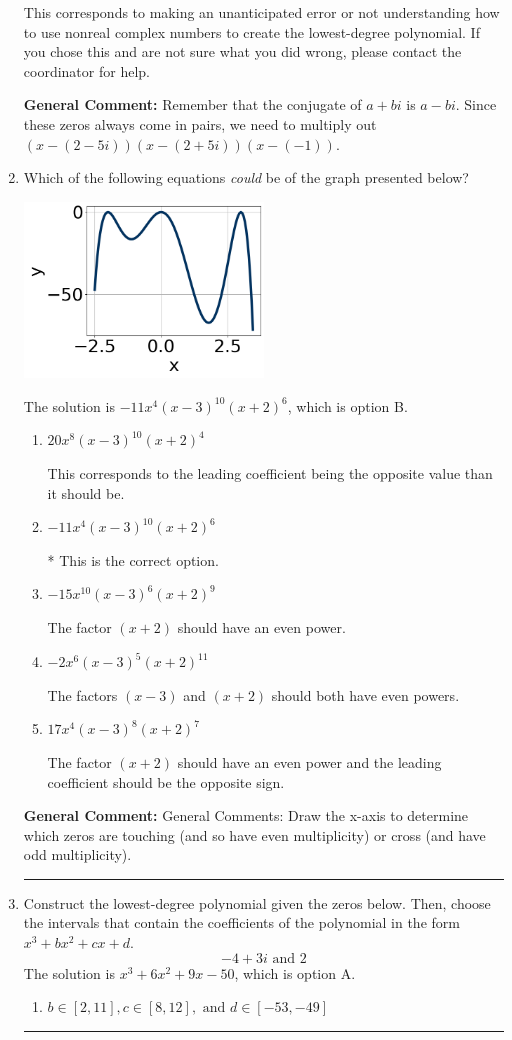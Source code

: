 \documentclass{extbook}[14pt]
\newcommand{\litem}[1]{\item #1

\rule{\textwidth}{0.4pt}}
\begin{document}
\begin{enumerate}
{\begin{enumerate}[label=\Alph*.]
This corresponds to making an unanticipated error or not understanding how to use nonreal complex numbers to create the lowest-degree polynomial. If you chose this and are not sure what you did wrong, please contact the coordinator for help.
\end{enumerate}

\textbf{General Comment:} Remember that the conjugate of $a+bi$ is $a-bi$. Since these zeros always come in pairs, we need to multiply out $(x-(2 - 5 i))(x-(2 + 5 i))(x-(-1))$.
}
\litem{
Which of the following equations \textit{could} be of the graph presented below?

\begin{center}
    \includegraphics[width=0.5\textwidth]{../Figures/polyGraphToFunctionC.png}
\end{center}


The solution is \( -11x^{4} (x - 3)^{10} (x + 2)^{6} \), which is option B.\begin{enumerate}[label=\Alph*.]
\item \( 20x^{8} (x - 3)^{10} (x + 2)^{4} \)

This corresponds to the leading coefficient being the opposite value than it should be.
\item \( -11x^{4} (x - 3)^{10} (x + 2)^{6} \)

* This is the correct option.
\item \( -15x^{10} (x - 3)^{6} (x + 2)^{9} \)

The factor $(x + 2)$ should have an even power.
\item \( -2x^{6} (x - 3)^{5} (x + 2)^{11} \)

The factors $(x - 3)$ and $(x + 2)$ should both have even powers.
\item \( 17x^{4} (x - 3)^{8} (x + 2)^{7} \)

The factor $(x + 2)$ should have an even power and the leading coefficient should be the opposite sign.
\end{enumerate}

\textbf{General Comment:} General Comments: Draw the x-axis to determine which zeros are touching (and so have even multiplicity) or cross (and have odd multiplicity).
}
\litem{
Construct the lowest-degree polynomial given the zeros below. Then, choose the intervals that contain the coefficients of the polynomial in the form $x^3+bx^2+cx+d$.
\[ -4 + 3 i \text{ and } 2 \]The solution is \( x^{3} +6 x^{2} +9 x -50 \), which is option A.\begin{enumerate}[label=\Alph*.]
\item \( b \in [2, 11], c \in [8, 12], \text{ and } d \in [-53, -49] \)


\end{enumerate}}
\end{enumerate}
\end{document}
